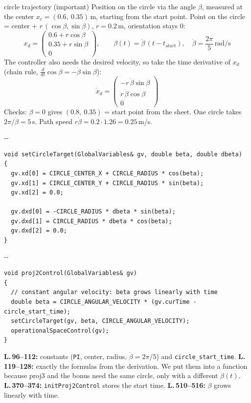 \documentclass[10pt,a4paper]{article}
\makeatletter
\newcommand{\secneed}[1]{\par\penalty\@M\begingroup\setlength{\dimen@}{#1}\dimen@ii\pagegoal
  \advance\dimen@ii-\pagetotal\ifdim\dimen@>\dimen@ii\ifdim\dimen@ii>\z@\vfil\fi\penalty-\@M\fi\endgroup}
\newcommand{\code}[1]{\texttt{#1}}
\makeatother
\begin{document}
\begin{herleitung}{circle trajectory (important)}
Position on the circle via the angle $\beta$, measured at the center $x_{c} = (0.6,\ 0.35)$\,m, starting from the start
point. Point on the circle = center + $r\,(\cos\beta, \sin\beta)$, $r = 0.2$\,m, orientation stays 0:
\[
  x_d = \begin{pmatrix} 0.6 + r\cos\beta \\ 0.35 + r\sin\beta \\ 0 \end{pmatrix},
  \qquad \beta(t) = \dot\beta\,(t - t_{start}),\quad \dot\beta = \frac{2\pi}{5}\,\text{rad/s}
\]
The controller also needs the desired velocity, so take the time derivative of $x_d$ (chain rule,
$\frac{d}{dt}\cos\beta = -\dot\beta\sin\beta$):
\[
  \dot x_d = \begin{pmatrix} -r\,\dot\beta\sin\beta \\ r\,\dot\beta\cos\beta \\ 0 \end{pmatrix}
\]
Checks: $\beta = 0$ gives $(0.8,\ 0.35)$ = start point from the sheet. One circle takes $2\pi/\dot\beta = 5$\,s.
Path speed $r\dot\beta = 0.2 \cdot 1.26 = 0.25$\,m/s.
\end{herleitung}

\secneed{10\baselineskip}
\begin{lstlisting}[firstnumber=119]
void setCircleTarget(GlobalVariables& gv, double beta, double dbeta)
{
  gv.xd[0] = CIRCLE_CENTER_X + CIRCLE_RADIUS * cos(beta);
  gv.xd[1] = CIRCLE_CENTER_Y + CIRCLE_RADIUS * sin(beta);
  gv.xd[2] = 0.0;

  gv.dxd[0] = -CIRCLE_RADIUS * dbeta * sin(beta);
  gv.dxd[1] = CIRCLE_RADIUS * dbeta * cos(beta);
  gv.dxd[2] = 0.0;
}
\end{lstlisting}
\vspace{-4pt}
\secneed{8\baselineskip}
\begin{lstlisting}[firstnumber=510]
void proj2Control(GlobalVariables& gv)
{
  // constant angular velocity: beta grows linearly with time
  double beta = CIRCLE_ANGULAR_VELOCITY * (gv.curTime - circle_start_time);
  setCircleTarget(gv, beta, CIRCLE_ANGULAR_VELOCITY);
  operationalSpaceControl(gv);
}
\end{lstlisting}
\textbf{L.\,96--112:} constants (\code{PI}, center, radius, $\dot\beta = 2\pi/5$) and \code{circle\_start\_time}.
\textbf{L.\,119--128:} exactly the formulas from the derivation. We put them into a function because proj3 and the bonus
need the same circle, only with a different $\beta(t)$. \textbf{L.\,370--374:} \code{initProj2Control} stores the start
time. \textbf{L.\,510--516:} $\beta$ grows linearly with time.
\end{document}
